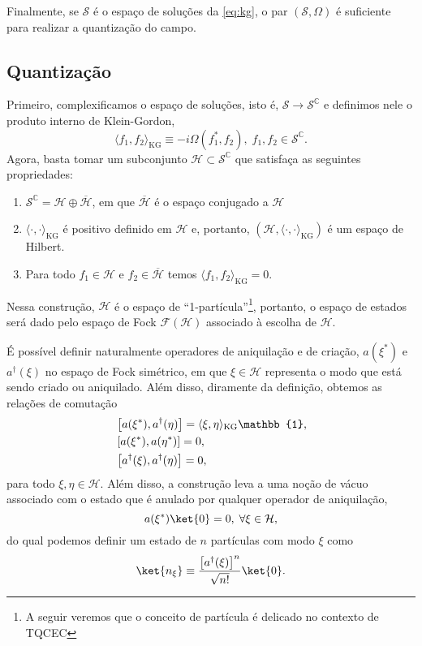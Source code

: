 \documentclass[12pt]{article}
\newcommand{\s}{\mathcal{S}}
\newcommand{\innerkg}[2]{\langle#1,#2\rangle_{\text{KG}}}
\newcommand{\h}{\mathcal{H}}
\begin{document}
Finalmente, se \(\s\) é o espaço de soluções da \cref{eq:kg}, o par \((\s,\Omega)\) é suficiente para realizar a quantização do campo.

\subsection*{Quantização}
Primeiro, complexificamos o espaço de soluções, isto é, \(\s\to\s^{\mathbb{C}}\) e definimos nele o produto interno de Klein-Gordon,
\begin{equation}
    \innerkg{f_1}{f_2}\equiv-i\Omega(f_1^*,f_2),\; f_1,f_2\in\s^{\mathbb{C}}.
\end{equation}
Agora, basta tomar um subconjunto \(\h\subset\s^{\mathbb{C}}\) que satisfaça as seguintes propriedades:
\begin{enumerate}
    \item \(\s^{\mathbb{C}}=\h\oplus\overline{\h}\), em que \(\overline{\h}\) é o espaço conjugado a \(\h\)
    \item \(\innerkg{\cdot}{\cdot}\) é positivo definido em \(\h\) e, portanto, \(\left(\h,\innerkg{\cdot}{\cdot}\right)\) é um espaço de Hilbert.
    \item Para todo \(f_1\in\h\) e \(f_2\in\overline{\h}\) temos \(\innerkg{f_1}{f_2}=0\).
\end{enumerate}

Nessa construção, \(\h\) é o espaço de \enquote{1-partícula}\footnote{A seguir veremos que o conceito de partícula é delicado no contexto de TQCEC}, portanto, o espaço de estados será dado pelo espaço de Fock \(\mathcal{F}(\h)\) associado à escolha de \(\h\).

É possível definir naturalmente operadores de aniquilação e de criação, \(a(\xi^*)\) e \(a^\dagger(\xi)\) no espaço de Fock simétrico, em que \(\xi\in\h\) representa o modo que está sendo criado ou aniquilado. Além disso, diramente da definição, obtemos as relações de comutação
\begin{subequations}
    \begin{align}
        &\relax\left[a(\xi^*),a^{\dagger}(\eta)\right]=\innerkg{\xi}{\eta}\mathbb{1},\\
        &\relax\left[a(\xi^*),a(\eta^*)\right]=0,\\
        &\relax\left[a^{\dagger}(\xi),a^{\dagger}(\eta)\right]=0,
    \end{align}
\end{subequations}
para todo \(\xi,\eta\in\h\). Além disso, a construção leva a uma noção de vácuo associado com o estado que é anulado por qualquer operador de aniquilação,
\begin{equation}
    a(\xi^*)\ket{0}=0,\;\forall\xi\in\h,
\end{equation}
do qual podemos definir um estado de \(n\) partículas com modo \(\xi\) como
\begin{equation}
    \ket{n_\xi}\equiv\frac{\left[a^{\dagger}(\xi)\right]^n}{\sqrt{n!}}\ket{0}.
\end{equation}
\end{document}
